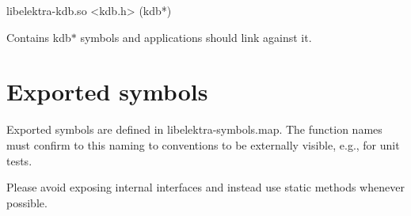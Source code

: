 \begin{DoxyVerb}libelektra-kdb.so
<kdb.h> (kdb*)
\end{DoxyVerb}


Contains {\ttfamily kdb$\ast$} symbols and applications should link against it.

\section*{Exported symbols}

Exported symbols are defined in libelektra-\/symbols.map. The function names must confirm to this naming to conventions to be externally visible, e.\+g., for unit tests.

Please avoid exposing internal interfaces and instead use {\ttfamily static} methods whenever possible. 